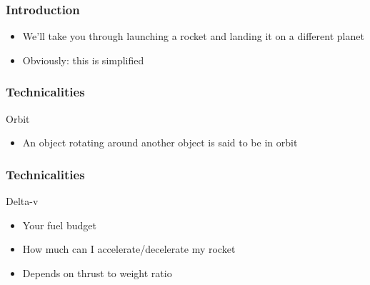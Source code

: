 {
%
\begin{frame}
    \frametitle{Introduction}
    \begin{block}{}
        \begin{itemize}
            \item We'll take you through launching a rocket and landing it on a different planet
            \item Obviously: this is simplified
        \end{itemize}
    \end{block}
\end{frame}
\begin{frame}
    \frametitle{Technicalities}
    \begin{block}{Orbit}
        \begin{itemize}
            \item An object rotating around another object is said to be in orbit
        \end{itemize}
    \end{block}
\end{frame}
\begin{frame}
    \frametitle{Technicalities}
    \begin{block}{Delta-v}
        \begin{itemize}
            \item Your fuel budget
            \item How much can I accelerate/decelerate my rocket
            \item Depends on thrust to weight ratio
        \end{itemize}
    \end{block}
\end{frame}
}
